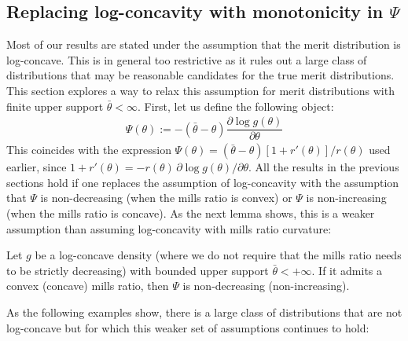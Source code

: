 \subsection{Replacing log-concavity with monotonicity in $\Psi$}
\noindent Most of our results are stated under the assumption that the merit distribution is log-concave. This is in general too restrictive as it rules out a large class of distributions that may be reasonable candidates for the true merit distributions. This section explores a way to relax this assumption for merit distributions with finite upper support $\bar{\theta}<\infty$. First, let us define the following object:
\begin{align*}
  \Psi(\theta) := -(\bar{\theta} - \theta)\dfrac{\partial \log g(\theta)}{\partial \theta}
\end{align*}
This coincides with the expression $\Psi(\theta)=(\bar{\theta}-\theta)[1+r'(\theta)]/r(\theta)$ used earlier, since $1+r'(\theta) = -r(\theta)\,\partial \log g(\theta)/\partial \theta$. All the results in the previous sections hold if one replaces the assumption of log-concavity with the assumption that $\Psi$ is non-decreasing (when the mills ratio is convex) or $\Psi$ is non-increasing (when the mills ratio is concave). As the next lemma shows, this is a weaker assumption than assuming log-concavity with mills ratio curvature:

\begin{lemma}\label{lemma:logconcave_implies_phi}
Let $g$ be a log-concave density (where we do not require that the mills ratio needs to be strictly decreasing) with bounded upper support $\bar{\theta}<+\infty$. If it admits a convex (concave) mills ratio, then $\Psi$ is non-decreasing (non-increasing). 
\end{lemma}

\noindent As the following examples show, there is a large class of distributions that are not log-concave but for which this weaker set of assumptions continues to hold:

